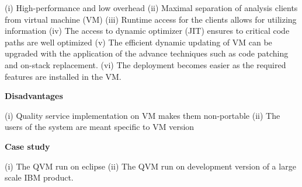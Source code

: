 \begin{compactitem}
(i)	High-performance and low overhead
(ii)	Maximal separation of analysis clients from virtual machine (VM)
(iii)	Runtime access for the clients allows for utilizing information
(iv)	The access to dynamic optimizer (JIT) ensures to critical code paths are well optimized
(v)	The efficient dynamic updating of VM can be upgraded with the application of the advance techniques such as code patching and on-stack replacement.  
(vi)	The deployment becomes easier as the required features are installed in the VM.


\item[\textbf{Disadvantages}] 

(i)	Quality service implementation on VM makes them non-portable
(ii)	The users of the system are meant specific to VM version

\item[\textbf{Case study}] 

(i)	The QVM run on eclipse
(ii)	The QVM run on development version of a large scale IBM product. 

\end{compactitem}




